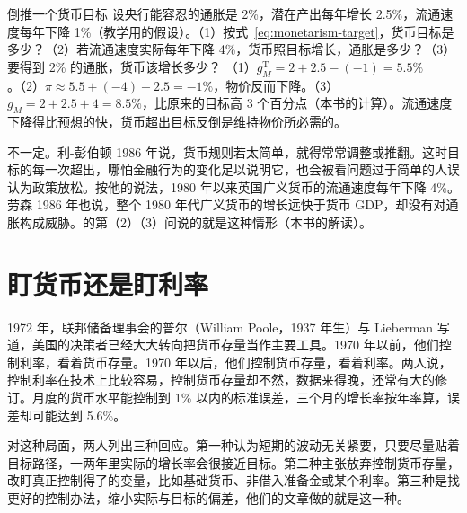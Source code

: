 \begin{example}{倒推一个货币目标}\label{ex:monetarism-target}
设央行能容忍的通胀是 2\%，潜在产出每年增长 2.5\%，流通速度每年下降 1\%（教学用的假设）。（1）按式~\eqref{eq:monetarism-target}，货币目标是多少？（2）若流通速度实际每年下降 4\%，货币照目标增长，通胀是多少？（3）要得到 2\% 的通胀，货币该增长多少？
\solution
（1）$g_M^{\mathrm{T}}=2+2.5-(-1)=5.5\%$。（2）$\pi\approx5.5+(-4)-2.5=-1\%$，物价反而下降。（3）$g_M=2+2.5+4=8.5\%$，比原来的目标高 3 个百分点（本书的计算）。流通速度下降得比预想的快，货币超出目标反倒是维持物价所必需的。
\end{example}

\begin{pitfall}
不一定。利-彭伯顿 1986 年说，货币规则若太简单，就得常常调整或推翻\cite{leighpemberton1986}。这时目标的每一次超出，哪怕金融行为的变化足以说明它，也会被看问题过于简单的人误认为政策放松\cite{leighpemberton1986}。按他的说法，1980 年以来英国广义货币的流通速度每年下降 4\%\cite{leighpemberton1986}。劳森 1986 年也说，整个 1980 年代广义货币的增长远快于货币 GDP，却没有对通胀构成威胁\cite{hansard1986}。的第（2）（3）问说的就是这种情形（本书的解读）。
\end{pitfall}

\section{盯货币还是盯利率}\label{sec:monetarism-poole}

1972 年，联邦储备理事会的普尔（William Poole，1937 年生）与 Lieberman 写道，美国的决策者已经大大转向把货币存量当作主要工具\cite{poolelieberman1972,loc45}。1970 年以前，他们控制利率，看着货币存量。1970 年以后，他们控制货币存量，看着利率\cite{poolelieberman1972}。两人说，控制利率在技术上比较容易，控制货币存量却不然，数据来得晚，还常有大的修订\cite{poolelieberman1972}。月度的货币水平能控制到 1\% 以内的标准误差，三个月的增长率按年率算，误差却可能达到 5.6\%\cite{poolelieberman1972}。

对这种局面，两人列出三种回应\cite{poolelieberman1972}。第一种认为短期的波动无关紧要，只要尽量贴着目标路径，一两年里实际的增长率会很接近目标。第二种主张放弃控制货币存量，改盯真正控制得了的变量，比如基础货币、非借入准备金或某个利率。第三种是找更好的控制办法，缩小实际与目标的偏差，他们的文章做的就是这一种\cite{poolelieberman1972}。

